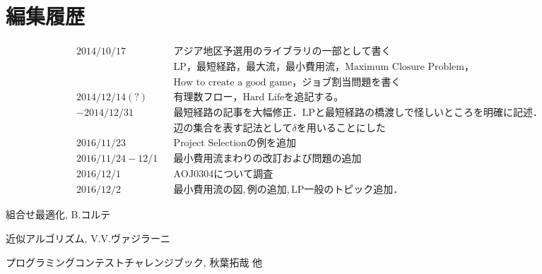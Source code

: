 \documentclass[13pt]{jarticle}
\theoremstyle{nonitalic} %
\begin{document}
\section*{編集履歴}
\begin{align*}
  &&& 2014/10/17 && アジア地区予選用のライブラリの一部として書く &&&\\
  &&&            && \mathrm{LP}， 最短経路， 最大流， 最小費用流， \textrm{Maximum Closure Problem}， \\
  &&&            &&\textrm{How to create a good game}， ジョブ割当問題を書く \\
  &&& 2014/12/14(?) && 有理数フロー， \textrm{Hard Life}を追記する。 \\
  &&& -2014/12/31    && 最短経路の記事を大幅修正．\textrm{LP}と最短経路の橋渡しで怪しいところを明確に記述．\\
  &&&               && 辺の集合を表す記法として \delta を用いることにした\\
  &&& 2016/11/23 && \textrm{Project Selection}の例を追加　\\
  &&& 2016/11/24-12/1 && 最小費用流まわりの改訂および問題の追加 \\
  &&& 2016/12/1 && \textrm{AOJ0304}について調査 \\
  &&& 2016/12/2 && 最小費用流の図,例の追加, \textrm{LP}一般のトピック追加．
\end{align*}

\begin{thebibliography}{99}
 組合せ最適化, B.コルテ

 近似アルゴリズム, V.V.ヴァジラーニ

 プログラミングコンテストチャレンジブック, 秋葉拓哉 他

\end{thebibliography}
\end{document}
